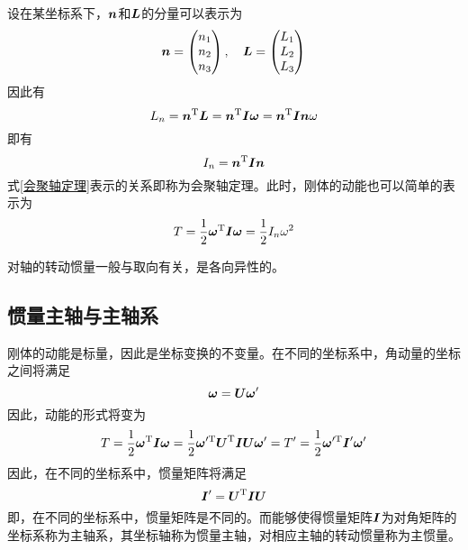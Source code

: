 设在某坐标系下，$\boldsymbol{n}$和$\boldsymbol{L}$的分量可以表示为
\begin{equation*}
	\boldsymbol{n} = \begin{pmatrix} n_1 \\ n_2 \\ n_3 \end{pmatrix},\quad \boldsymbol{L} = \begin{pmatrix} L_1 \\ L_2 \\ L_3 \end{pmatrix}
\end{equation*}
因此有
\begin{equation*}
	L_n = \boldsymbol{n}^{\mathrm{T}} \boldsymbol{L} = \boldsymbol{n}^{\mathrm{T}} \boldsymbol{I} \boldsymbol{\omega} = \boldsymbol{n}^{\mathrm{T}} \boldsymbol{I} \boldsymbol{n} \omega
\end{equation*}
即有
\begin{equation}
	I_n = \boldsymbol{n}^{\mathrm{T}} \boldsymbol{I} \boldsymbol{n}
	\label{会聚轴定理}
\end{equation}
式\eqref{会聚轴定理}表示的关系即称为{\heiti 会聚轴定理}。此时，刚体的动能也可以简单的表示为
\begin{equation}
	T = \frac12 \boldsymbol{\omega}^{\mathrm{T}} \boldsymbol{I} \boldsymbol{\omega} = \frac12 I_n \omega^2
\end{equation}

对轴的转动惯量一般与取向有关，是各向异性的。

\subsection{惯量主轴与主轴系}

刚体的动能是标量，因此是坐标变换的不变量。在不同的坐标系中，角动量的坐标之间将满足
\begin{equation*}
	\boldsymbol{\omega} = \boldsymbol{U} \boldsymbol{\omega}'
\end{equation*}
因此，动能的形式将变为
\begin{equation*}
	T = \frac12 \boldsymbol{\omega}^{\mathrm{T}} \boldsymbol{I} \boldsymbol{\omega} = \frac12 \boldsymbol{\omega}'^{\mathrm{T}} \boldsymbol{U}^{\mathrm{T}} \boldsymbol{I} \boldsymbol{U} \boldsymbol{\omega}' = T' = \frac12 \boldsymbol{\omega}'^{\mathrm{T}} \boldsymbol{I}' \boldsymbol{\omega}'
\end{equation*}
因此，在不同的坐标系中，惯量矩阵将满足
\begin{equation*}
	\boldsymbol{I}' = \boldsymbol{U}^{\mathrm{T}} \boldsymbol{I} \boldsymbol{U}
\end{equation*}
即，在不同的坐标系中，惯量矩阵是不同的。而能够使得惯量矩阵$\boldsymbol{I}$为对角矩阵的坐标系称为{\heiti 主轴系}，其坐标轴称为{\heiti 惯量主轴}，对相应主轴的转动惯量称为{\heiti 主惯量}。

